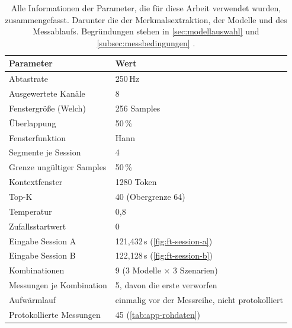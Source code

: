 \begin{table}[H]
\centering
\caption[Parameter der Messung]{Alle Informationen der Parameter, die für diese Arbeit verwendet wurden, zusammengefasst. Darunter die der Merkmalsextraktion, der Modelle und des Messablaufs. Begründungen stehen in \autoref{sec:modellauswahl} und \autoref{subsec:messbedingungen} \autocite{mediapipe_llm}.}
\label{tab:app-parameter}
\begin{tabular}{ll}
\toprule
\textbf{Parameter} & \textbf{Wert} \\
\midrule
Abtastrate                  & 250\,Hz \\
Ausgewertete Kanäle         & 8 \\
Fenstergröße (Welch)        & 256 Samples \\
Überlappung                 & 50\,\% \\
Fensterfunktion             & Hann \\
Segmente je Session         & 4 \\
Grenze ungültiger Samples   & 50\,\% \\
\midrule
Kontextfenster              & 1280 Token \\
Top-K                       & 40 (Obergrenze 64) \\
Temperatur                  & 0,8 \\
Zufallsstartwert            & 0 \\
\midrule
Eingabe Session A           & 121,432\,s (\autoref{fig:ft-session-a}) \\
Eingabe Session B           & 122,128\,s (\autoref{fig:ft-session-b}) \\
Kombinationen               & 9 (3 Modelle $\times$ 3 Szenarien) \\
Messungen je Kombination    & 5, davon die erste verworfen \\
Aufwärmlauf                 & einmalig vor der Messreihe, nicht protokolliert \\
Protokollierte Messungen    & 45 (\autoref{tab:app-rohdaten}) \\
\bottomrule
\end{tabular}
\end{table}

